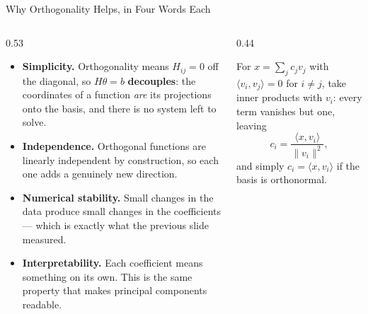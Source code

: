 \begin{frame}{Why Orthogonality Helps, in Four Words Each}
\begin{columns}[T]
\begin{column}{0.53\textwidth}
\small
\begin{itemize}\small\setlength{\itemsep}{1.5mm}
  \item \textbf{Simplicity.} Orthogonality means $H_{ij}=0$ off the diagonal, so $H\theta=b$ \textbf{decouples}: the coordinates of a function \emph{are} its projections onto the basis, and there is no system left to solve.
  \item \textbf{Independence.} Orthogonal functions are linearly independent by construction, so each one adds a genuinely new direction.
  \item \textbf{Numerical stability.} Small changes in the data produce small changes in the coefficients --- which is exactly what the previous slide measured.
  \item \textbf{Interpretability.} Each coefficient means something on its own. This is the same property that makes principal components readable.
\end{itemize}
\end{column}
\begin{column}{0.44\textwidth}
\begin{conceptbox}[title=\textbf{The formula}]\small
For $x=\sum_j c_j v_j$ with $\langle v_i,v_j\rangle=0$ for $i\neq j$, take inner products with $v_i$: every term vanishes but one, leaving
\[
  c_i=\frac{\langle x,v_i\rangle}{\|v_i\|^{2}},
\]
and simply $c_i=\langle x,v_i\rangle$ if the basis is orthonormal.
\end{conceptbox}
\end{column}
\end{columns}
\vspace{1mm}
\end{frame}

